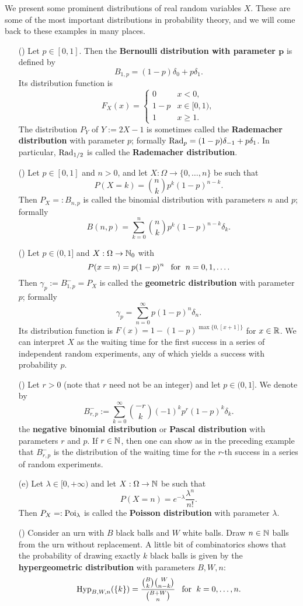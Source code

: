 \begin{example}
We present some prominent distributions of real random variables $X$. These are some of the most important distributions in probability theory, and we will come back to these examples in many places.
\begin{itemize}
\item[(\rmnum{1})] Let $p\in[0,1]$. Then the \textbf{Bernoulli distribution with parameter $\bm{p}$} is defined by
\[B_{1,p}=(1-p)\delta_0+p\delta_1.\]
Its distribution function is
\[F_X(x)=\begin{cases}
0&x<0,\\
1-p&x\in[0,1),\\
1&x\geq 1.
\end{cases}\] 
The distribution $P_Y$ of $Y:=2X-1$ is sometimes called the \textbf{Rademacher distribution} with parameter $p$; formally $\mathrm{Rad}_p=(1-p)\delta_{-1}+p\delta_1$. In particular, $\mathrm{Rad}_{1/2}$ is called the \textbf{Rademacher distribution}.
\item[(\rmnum{2})] Let $p\in [0,1]$ and $n>0$, and let $X:\Omega\to\{0,\dots,n\}$ be such that
\[P(X=k)=\binom{n}{k}p^k(1-p)^{n-k}.\]
Then $P_X=:B_{n,p}$ is called the binomial distribution with parameters $n$ and $p$; formally 
\[B(n,p)=\sum_{k=0}^{n}\binom{n}{k}p^k(1-p)^{n-k}\delta_k.\]
\item[(\rmnum{3})] Let $p\in(0,1]$ and $X:\Omega\to\mathbb{N}_0$ with
\[P(x=n)=p(1-p)^n\hspace{8pt}\text{for}\hspace{6pt} n=0,1,\dots.\]
Then $\gamma_p:=B^-_{1,p}=P_X$ is called the \textbf{geometric distribution} with parameter $p$; formally
\[\gamma_p=\sum_{n=0}^{\infty}p(1-p)^n\delta_n.\]
Its distribution function is $F(x)=1-(1-p)^{\max\{0,[x+1]\}}$ for $x\in\mathbb{R}$. We can interpret $X$ as the waiting time for the first success in a series of independent random experiments, any of which yields a success with probability $p$.
\item[(\rmnum{4})] Let $r>0$ (note that $r$ need not be an integer) and let $p\in(0,1]$. We denote by
\[B^-_{r,p}:=\sum_{k=0}^{\infty}\binom{-r}{k}(-1)^kp^r(1-p)^k\delta_k.\]
the \textbf{negative binomial distribution} or \textbf{Pascal distribution} with parameters $r$ and $p$. If $r\in\mathbb{N}$, then one can show as in the preceding example that $B^-_{r,p}$ is the distribution of the waiting time for the $r$-th success in a series of random experiments.
\item[(e)] Let $\lambda\in[0,+\infty)$ and let $X:\Omega\to\mathbb{N}$ be such that
\[P(X=n)=e^{-\lambda}\frac{\lambda^n}{n!}.\]
Then $P_X=:\mathrm{Poi}_\lambda$ is called the \textbf{Poisson distribution} with parameter $\lambda$.
\item[(\rmnum{5})] Consider an urn with $B$ black balls and $W$ white balls. Draw $n\in\mathbb{N}$ balls from the urn without replacement. A little bit of combinatorics shows that the probability of drawing exactly $k$ black balls is given by the \textbf{hypergeometric distribution} with parameters $B,W,n$:
\[\mathrm{Hyp}_{B,W,n}(\{k\})=\frac{\binom{B}{k}\binom{W}{n-k}}{\binom{B+W}{n}}\hspace{8pt}\text{for}\hspace{6pt} k=0,\dots,n.\]
\end{itemize}
\end{example}
